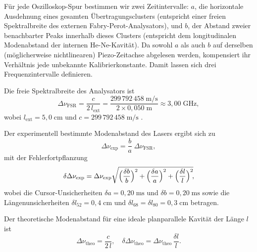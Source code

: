  Für jede Oszilloskop-Spur bestimmen wir zwei Zeitintervalle: $a$, die horizontale Ausdehnung eines gesamten Übertragungsclusters (entspricht einer freien Spektralbreite des externen Fabry-Perot-Analysators), und $b$, der Abstand zweier benachbarter Peaks innerhalb dieses Clusters (entspricht dem longitudinalen Modenabstand der internen He-Ne-Kavität). 
 Da sowohl $a$ als auch $b$ auf derselben (möglicherweise nichtlinearen) Piezo-Zeitachse abgelesen werden, kompensiert ihr Verhältnis jede unbekannte Kalibrierkonstante. Damit lassen sich drei Frequenzintervalle definieren.

Die freie Spektralbreite des Analysators ist
\begin{equation}
  \Delta\nu_{\mathrm{FSR}}
  = \frac{c}{2\,l_{\mathrm{ext}}}
  = \frac{299\,792\,458\;\mathrm{m/s}}{2 \times 0{,}050\;\mathrm{m}}
  \approx 3{,}00\;\mathrm{GHz},
\end{equation}
wobei $l_{\mathrm{ext}} = 5{,}0\;\mathrm{cm}$ und  $c = 299\,792\,458\;\mathrm{m/s}$ \cite{codata}.

Der experimentell bestimmte Modenabstand des Lasers ergibt sich zu
\begin{equation}
 \Delta\nu_{\mathrm{exp}}
  = \frac{b}{a}\;\Delta\nu_{\mathrm{FSR}},
\end{equation}
mit der Fehlerfortpflanzung
\begin{equation}
  \delta\Delta\nu_{\mathrm{exp}}
  =\Delta\nu_{\mathrm{exp}}
    \sqrt{\Bigl(\frac{\delta b}{b}\Bigr)^{2}
        + \Bigl(\frac{\delta a}{a}\Bigr)^{2}
        + \Bigl(\frac{\delta l}{l}\Bigr)^{2}}\!,
\end{equation}
wobei die Cursor-Unsicherheiten $\delta a = 0{,}20\;\mathrm{ms}$ und $\delta b = 0{,}20\;\mathrm{ms}$ sowie die Längenunsicherheiten $\delta l_{52} = 0{,}4\;\mathrm{cm}$ und $\delta l_{68} = \delta l_{80} = 0{,}3\;\mathrm{cm}$ betragen.

Der theoretische Modenabstand für eine ideale planparallele Kavität der Länge $l$ ist
\begin{equation}
 \Delta\nu_{\mathrm{theo}}
  = \frac{c}{2\,l},
  \quad
  \delta\Delta\nu_{\mathrm{theo}}
  =\Delta\nu_{\mathrm{theo}}\,\frac{\delta l}{l}.
\end{equation}

